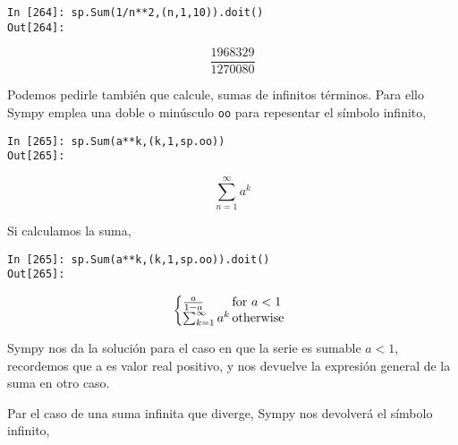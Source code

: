 \begin{center}
	\begin{minipage}{.5\textwidth}
		\begin{verbatim}
In [264]: sp.Sum(1/n**2,(n,1,10)).doit()
Out[264]: 	
		\end{verbatim}
		\begin{equation*}
			\frac{1968329}{1270080}
		\end{equation*}
	\end{minipage}
\end{center}
\begin{paracol}{2}
Podemos pedirle también que calcule, sumas de infinitos términos. Para ello Sympy emplea una doble o minúsculo \texttt{oo} para repesentar el símbolo infinito,
\end{paracol}
\begin{center}
	\begin{minipage}{.8\textwidth}
		\begin{verbatim}
In [265]: sp.Sum(a**k,(k,1,sp.oo))
Out[265]: 	
		\end{verbatim}
		\begin{equation*}
		\sum_{n=1}^{\infty}a^k	
		\end{equation*}
	\end{minipage}
\end{center}
\begin{paracol}{2}
Si calculamos la suma,
\end{paracol}
\begin{center}
	\begin{minipage}{.6\textwidth}
		\begin{verbatim}
In [265]: sp.Sum(a**k,(k,1,sp.oo)).doit()
Out[265]: 	
		\end{verbatim}
		\begin{equation*}
		\left\{
		\begin{array}{@{}l@{\,}l}
			\frac{a}{1-a} & \text{for}\ a<1 \\
			\sum_{k=1}^{\infty} a^k & \text{otherwise}
		\end{array}
		\right.
	\end{equation*}
	\end{minipage}
\end{center}

\begin{paracol}{2}
Sympy nos da la solución para el caso en que la serie es sumable $a<1$, recordemos que a es valor real positivo, y nos devuelve la expresión general de la suma en otro caso.

Par el caso de una suma infinita que diverge, Sympy nos devolverá el símbolo infinito,
\end{paracol}

